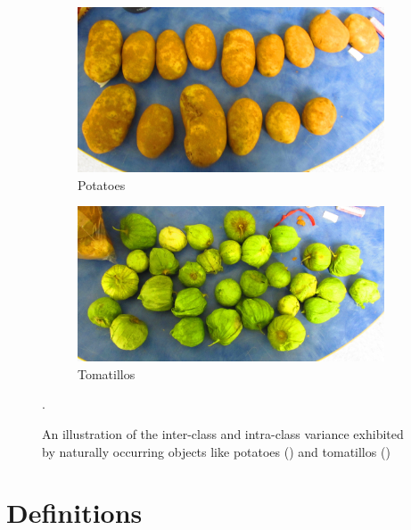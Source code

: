 \documentclass {udthesis}
\begin{document}
\begin{figure}
  \centering
  \begin{subfigure}[]{0.45\textwidth}
      \includegraphics[width=\textwidth]{potatoes_species}
      \caption{Potatoes}
      \label{fig:potato_species}
  \end{subfigure}
  \begin{subfigure}[]{0.45\textwidth}
      \includegraphics[width=\textwidth]{tomatillos_species}
      \caption{Tomatillos}
      \label{fig:tomatillo_species}
  \end{subfigure}
\caption[Illustration of the inter-class and intra-class variance exhibited by naturally occurring objects]
{An illustration of the inter-class and intra-class variance exhibited by naturally occurring objects like 
potatoes () and tomatillos ()}.
\label{fig:produce_species}
\end{figure}	
%
\section{Definitions}
\end{document}
